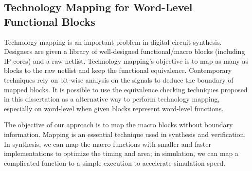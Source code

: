 \begin{figure}[bp]
\end{figure}

% 

\subsection{Technology Mapping for Word-Level Functional Blocks}
Technology mapping is an important problem in digital circuit synthesis.
Designers are given a library of well-designed functional/macro blocks (including IP cores) and a raw netlist.
Technology mapping's objective is to map as many as blocks to the raw netlist and 
keep the functional equivalence. Contemporary techniques rely on bit-wise 
analysis on the signals to deduce the boundary of mapped blocks.
It is possible to use the equivalence checking techniques proposed in this dissertation 
as a alternative way to perform technology mapping, especially on word-level when 
given blocks represent word-level functions.

The objective of our approach is to map the macro blocks without boundary information.
Mapping is an essential technique used in synthesis and verification. In synthesis, we can map the 
macro functions with smaller and faster implementations to optimize the timing and area; in simulation,
we can map a complicated function to a simple execution to accelerate simulation speed.

